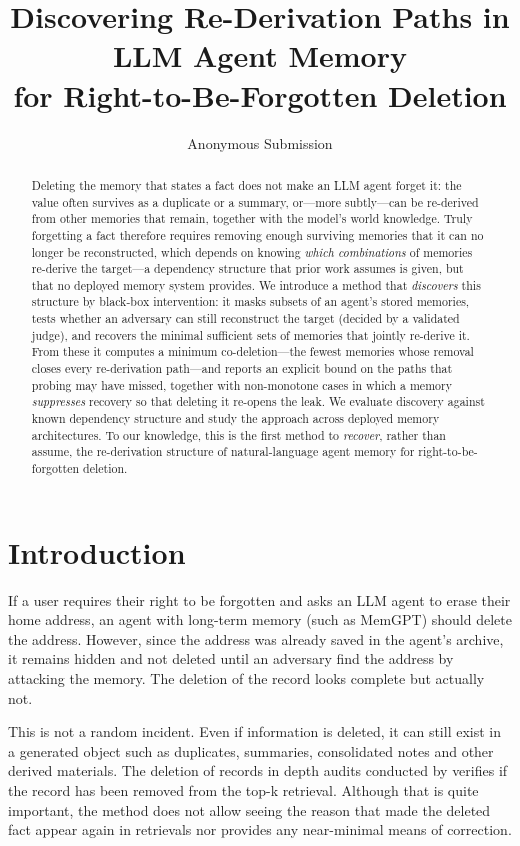 \documentclass[letterpaper]{article}
\title{Discovering Re-Derivation Paths in LLM Agent Memory\\
       for Right-to-Be-Forgotten Deletion}
\author{
    Anonymous Submission
}
\begin{document}
\maketitle

\begin{abstract}
Deleting the memory that states a fact does not make an LLM agent forget it: the value often survives as a duplicate or a summary, or---more subtly---can be re-derived from other memories that remain, together with the model's world knowledge. Truly forgetting a fact therefore requires removing enough surviving memories that it can no longer be reconstructed, which depends on knowing \emph{which combinations} of memories re-derive the target---a dependency structure that prior work assumes is given, but that no deployed memory system provides. We introduce a method that \emph{discovers} this structure by black-box intervention: it masks subsets of an agent's stored memories, tests whether an adversary can still reconstruct the target (decided by a validated judge), and recovers the minimal sufficient sets of memories that jointly re-derive it. From these it computes a minimum co-deletion---the fewest memories whose removal closes every re-derivation path---and reports an explicit bound on the paths that probing may have missed, together with non-monotone cases in which a memory \emph{suppresses} recovery so that deleting it re-opens the leak. We evaluate discovery against known dependency structure and study the approach across deployed memory architectures. To our knowledge, this is the first method to \emph{recover}, rather than assume, the re-derivation structure of natural-language agent memory for right-to-be-forgotten deletion.
\end{abstract}

\section{Introduction}\label{sec:intro}

If a user requires their right to be forgotten \citep{gdpr2016} and asks an LLM agent to erase their home address, an agent with long-term memory (such as MemGPT) should delete the address. However, since the address was already saved in the agent’s archive, it remains hidden and not deleted until an adversary find the address by attacking the memory. The deletion of the record looks complete but actually not.

This is not a random incident. Even if information is deleted, it can still exist in a generated object such as duplicates, summaries, consolidated notes and other derived materials. The deletion of records in depth audits conducted by \citep{forgeteval} verifies if the record has been removed from the top-k retrieval. Although that is quite important, the method does not allow seeing the reason that made the deleted fact appear again in retrievals nor provides any near-minimal means of correction. 
\end{document}
